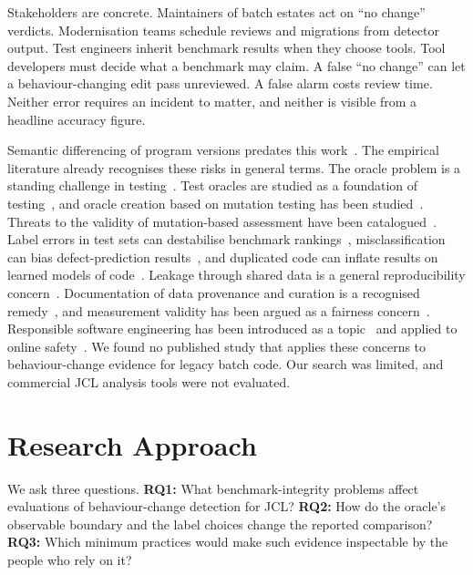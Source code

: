 \documentclass[conference]{IEEEtran}
\begin{document}
Stakeholders are concrete. Maintainers of batch estates act on ``no change'' verdicts. Modernisation teams schedule reviews and migrations from detector output. Test engineers inherit benchmark results when they choose tools. Tool developers must decide what a benchmark may claim. A false ``no change'' can let a behaviour-changing edit pass unreviewed. A false alarm costs review time. Neither error requires an incident to matter, and neither is visible from a headline accuracy figure.

Semantic differencing of program versions predates this work~\cite{jackson1994}. The empirical literature already recognises these risks in general terms. The oracle problem is a standing challenge in testing~\cite{barr2015}. Test oracles are studied as a foundation of testing~\cite{staats2011}, and oracle creation based on mutation testing has been studied~\cite{staats2012}. Threats to the validity of mutation-based assessment have been catalogued~\cite{papadakis2016}. Label errors in test sets can destabilise benchmark rankings~\cite{northcutt2021}, misclassification can bias defect-prediction results~\cite{herzig2013}, and duplicated code can inflate results on learned models of code~\cite{allamanis2019}. Leakage through shared data is a general reproducibility concern~\cite{kapoor2023}. Documentation of data provenance and curation is a recognised remedy~\cite{gebru2021}, and measurement validity has been argued as a fairness concern~\cite{jacobs2021}. Responsible software engineering has been introduced as a topic~\cite{schieferdecker2019} and applied to online safety~\cite{zhang2025}. We found no published study that applies these concerns to behaviour-change evidence for legacy batch code. Our search was limited, and commercial JCL analysis tools were not evaluated.

\section{Research Approach}
We ask three questions. \textbf{RQ1:} What benchmark-integrity problems affect evaluations of behaviour-change detection for JCL? \textbf{RQ2:} How do the oracle's observable boundary and the label choices change the reported comparison? \textbf{RQ3:} Which minimum practices would make such evidence inspectable by the people who rely on it?
\end{document}
